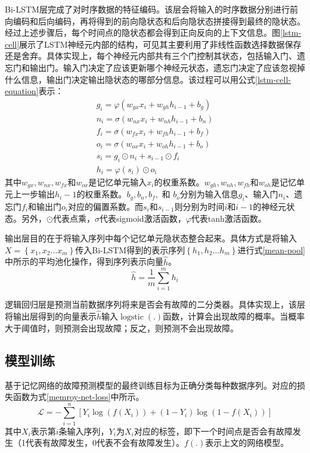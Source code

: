 Bi-LSTM层完成了对时序数据的特征编码。该层会将输入的时序数据分别进行前向编码和后向编码，再将得到的前向隐状态和后向隐状态拼接得到最终的隐状态。经过上述步骤后，每个时间点的隐状态都会得到正向反向的上下文信息。图\ref{lstm-cell}展示了LSTM神经元内部的结构，可见其主要利用了非线性函数选择数据保存还是舍弃。具体实现上，每个神经元内部共有三个门控制其状态，包括输入门、遗忘门和输出门。输入门决定了应该更新哪个神经元状态，遗忘门决定了应该忽视掉什么信息，输出门决定输出隐状态的哪部分信息。该过程可以用公式\ref{lstm-cell-equation}表示：
\begin{equation}
    \begin{array}{l}
    g_{i}=\varphi\left(w_{g x} x_{i}+w_{g h} h_{i - 1}+b_{g}\right) \\
    n_{i}=\sigma\left(w_{n x} x_{i}+w_{n h} h_{i- 1}+b_{n}\right) \\
    f_{i}=\sigma\left(w_{f x} x_{i}+w_{f h} h_{i- 1}+b_{f}\right) \\
    o_{i}=\sigma\left(w_{o x} x_{i}+w_{o h} h_{i- 1}+b_{o}\right) \\
    s_{i}=g_{i} \odot n_{i}+s_{i -1} \odot f_{i} \\
    h_{i}=\varphi\left(s_{i}\right) \odot o_{i}
    \end{array}
    \label{lstm-cell-equation}
\end{equation}
其中$w_{gx}, w_{nx}, w_{fx} $和$w_{ox} $是记忆单元输入$x_{i}$的权重系数。$w_{gh}, w_{nh}, w_{fh} $和$w_{oh} $是记忆单元上一步输出$h_{i}-1$的权重系数。$b_{g}, b_{n}, b_{f},$ 和 $b_{o}$分别为输入信息$g_{i}$、输入门$n_{i}$、遗忘门$f_{i}$和输出门$o_{i}$对应的偏置系数。而$s_{i}$和$s_{i-1}$则分别为时间$i$和$i-1$的神经元状态。另外，$\odot$代表点乘，$\sigma$代表sigmoid激活函数，$\varphi$代表tanh激活函数。

输出层目的在于将输入序列中每个记忆单元隐状态整合起来。具体方式是将输入$X=\left\{x_{1}, x_{2} \ldots x_{m}\right\}$传入Bi-LSTM得到的表示序列$\left\{h_{1}, h_{2} \ldots h_{m}\right\}$进行式\ref{mean-pool}中所示的平均池化操作，得到序列表示向量$\widehat{h}$。
\begin{equation}
    \widehat{h}=\frac{1}{m} \sum_{i=1}^{m} h_{i}
    \label{mean-pool}
\end{equation}

逻辑回归层是预测当前数据序列将来是否会有故障的二分类器。具体实现上，该层将输出层得到的向量表示$\widehat{h}$输入$\operatorname{logstic}(.)$函数，计算会出现故障的概率。当概率大于阈值时，则预测会出现故障；反之，则预测不会出现故障。

\subsection{模型训练}
基于记忆网络的故障预测模型的最终训练目标为正确分类每种数据序列。对应的损失函数为式\ref{memroy-net-loss}中所示。
\begin{equation}
    \mathcal{L}=-\sum_{i=1}^{n}\left[Y_{i} \log \left(f\left(X_{i} \right)\right)+\left(1-Y_{i}\right) \log \left(1-f\left(X_{i} \right)\right)\right]
    \label{memroy-net-loss}
\end{equation}
其中$X_{i}$表示第$i$条输入序列，$Y_{i}$为$X_{i}$对应的标签，即下一个时间点是否会有故障发生（1代表有故障发生，0代表不会有故障发生）。$f\left(.\right)$表示上文的网络模型。
